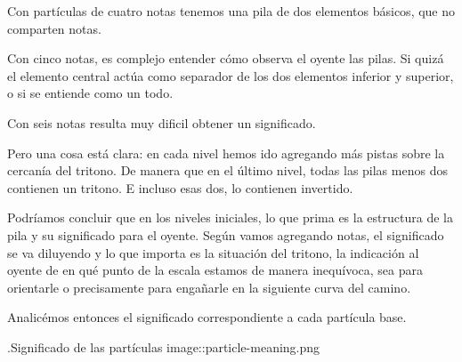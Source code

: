 \documentclass[]{article}
\begin{document}
Con partículas de cuatro notas tenemos una pila de dos elementos básicos, que no comparten notas.

Con cinco notas, es complejo entender cómo observa el oyente las pilas. Si quizá el elemento central actúa como separador de los dos elementos inferior y superior, o si se entiende como un todo.

Con seis notas resulta muy dificil obtener un significado.

Pero una cosa está clara: en cada nivel hemos ido agregando más pistas sobre la cercanía del tritono. De manera que en el último nivel, todas las pilas menos dos contienen un tritono. E incluso esas dos, lo contienen invertido.

Podríamos concluir que en los niveles iniciales, lo que prima es la estructura de la pila y su significado para el oyente. Según vamos agregando notas, el significado se va diluyendo y lo que importa es la situación del tritono, la indicación al oyente de en qué punto de la escala estamos de manera inequívoca, sea para orientarle o precisamente para engañarle en la siguiente curva del camino.

Analicémos entonces el significado correspondiente a cada partícula base.

.Significado de las partículas image::particle-meaning.png
\end{document}
